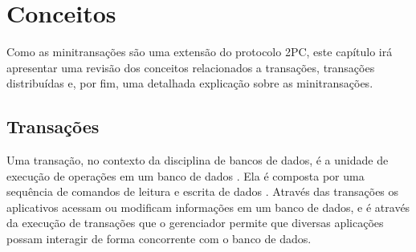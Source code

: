 \documentclass[11pt,twoside,a4paper]{book}
\begin{document}
\chapter{Conceitos}
\label{chap:conceitos}
Como as minitransações são uma extensão do protocolo 2PC, este capítulo irá apresentar uma revisão dos conceitos relacionados a transações, transações distribuídas e, por fim, uma detalhada explicação sobre as minitransações.

\section{Transações}
\label{sec:transacoes}
Uma transação, no contexto da disciplina de bancos de dados, é a unidade de execução de operações em um banco de dados \cite{garcia-molina}. Ela é composta por uma sequência de comandos de leitura e escrita de dados \cite{vaca}. Através das transações os aplicativos acessam ou modificam informações em um banco de dados, e é através da execução de transações que o gerenciador permite que diversas aplicações possam interagir de forma concorrente com o banco de dados.
\end{document}
